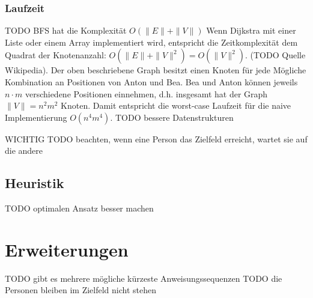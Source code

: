 \documentclass[a4paper,10pt,ngerman]{scrartcl}
\begin{document}
\subsubsection{Laufzeit}
TODO BFS hat die Komplexität $O(\|E\| + \| V\|)$
Wenn Dijkstra mit einer Liste oder einem Array implementiert wird, entspricht die Zeitkomplexität dem Quadrat der Knotenanzahl: $O(\|E\| + \|V\|^2) = O(\|V\|^2)$. (TODO Quelle Wikipedia).
Der oben beschriebene Graph besitzt einen Knoten für jede Mögliche Kombination an Positionen von Anton und Bea. Bea und Anton können jeweils $n \cdot m$ verschiedene Positionen einnehmen, d.h. insgesamt hat der Graph $\|V\| = n^2 m^2$ Knoten. Damit entspricht die worst-case Laufzeit für die naive Implementierung $O(n^4  m^4)$.
TODO bessere Datenstrukturen

WICHTIG TODO beachten, wenn eine Person das Zielfeld erreicht, wartet sie auf die andere

\subsection{Heuristik} TODO optimalen Ansatz besser machen

\section{Erweiterungen}
TODO gibt es mehrere mögliche kürzeste Anweisungssequenzen
TODO die Personen bleiben im Zielfeld nicht stehen
\end{document}
